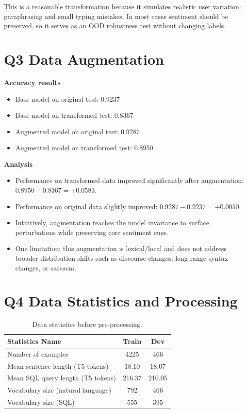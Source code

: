 \documentclass{article}
\begin{document}
This is a reasonable transformation because it simulates realistic user variation: paraphrasing and
small typing mistakes. In most cases sentiment should be preserved, so it serves as an OOD robustness test
without changing labels.

\section*{Q3 Data Augmentation}
\textbf{Accuracy results}
\begin{itemize}
  \item Base model on original test: 0.9237
  \item Base model on transformed test: 0.8367
  \item Augmented model on original test: 0.9287
  \item Augmented model on transformed test: 0.8950
\end{itemize}

\textbf{Analysis}
\begin{itemize}
  \item Performance on transformed data improved significantly after augmentation: $0.8950 - 0.8367 = +0.0583$.
  \item Performance on original data slightly improved: $0.9287 - 0.9237 = +0.0050$.
  \item Intuitively, augmentation teaches the model invariance to surface perturbations while preserving
  core sentiment cues.
  \item One limitation: this augmentation is lexical/local and does not address broader distribution shifts
  such as discourse changes, long-range syntax changes, or sarcasm.
\end{itemize}

\section*{Q4 Data Statistics and Processing}
\begin{table}[h!]
\centering
\begin{tabular}{lcc}
\toprule
Statistics Name & Train & Dev \\
\midrule
Number of examples & 4225 & 466 \\
Mean sentence length (T5 tokens) & 18.10 & 18.07 \\
Mean SQL query length (T5 tokens) & 216.37 & 210.05 \\
Vocabulary size (natural language) & 792 & 466 \\
Vocabulary size (SQL) & 555 & 395 \\
\bottomrule
\end{tabular}
\caption{Data statistics before pre-processing.}
\label{tab:data_stats_before}
\end{table}
\end{document}
